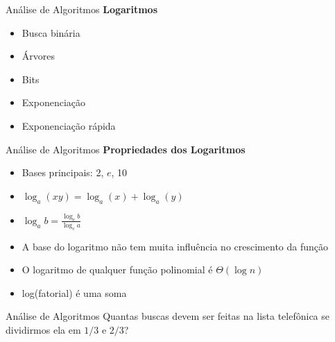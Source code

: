 \documentclass[10pt]{beamer}
\begin{document}
\begin{frame}{Análise de Algoritmos}
  \huge \textbf{Logaritmos}

  \Large
  \begin{itemize}
    \item Busca binária
    \item Árvores
    \item Bits
    \item Exponenciação
    \item Exponenciação rápida
  \end{itemize}
\end{frame}

\begin{frame}{Análise de Algoritmos}
  \huge \textbf{Propriedades dos Logaritmos}

  \Large
  \begin{itemize}
    \item Bases principais: 2, $e$, 10
    \item $\log_a (xy) = \log_a (x) + \log_a (y)$
    \item $\log_a b = \frac{\log_c b}{\log_c a}$
    \item A base do logaritmo não tem muita influência no crescimento da função
    \item O logaritmo de qualquer função polinomial é $\Theta(\log n)$
    \item log(fatorial) é uma soma
  \end{itemize}
\end{frame}

\begin{frame}{Análise de Algoritmos}
  \huge Quantas buscas devem ser feitas na lista telefônica se dividirmos ela em $1/3$ e $2/3$?
\end{frame}
\end{document}
